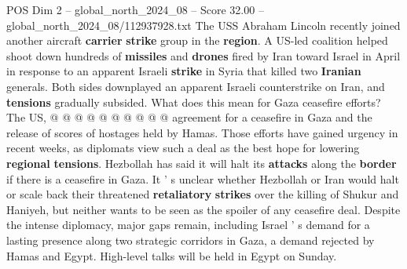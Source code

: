 \begin{textsample}{POS Dim 2 – global\_north\_2024\_08 – Score 32.00 – global\_north\_2024\_08/112937928.txt}
The USS Abraham Lincoln recently joined another aircraft \textbf{carrier} \textbf{strike} group in the \textbf{region}.
A US-led coalition helped shoot down hundreds of \textbf{missiles} and \textbf{drones} fired by Iran toward Israel in April in response to an apparent Israeli \textbf{strike} in Syria that killed two \textbf{Iranian} generals.
Both sides downplayed an apparent Israeli counterstrike on Iran, and \textbf{tensions} gradually subsided.
What does this mean for Gaza ceasefire efforts?
The US, @ @ @ @ @ @ @ @ @ @ agreement for a ceasefire in Gaza and the release of scores of hostages held by Hamas.
Those efforts have gained urgency in recent weeks, as diplomats view such a deal as the best hope for lowering \textbf{regional} \textbf{tensions}.
Hezbollah has said it will halt its \textbf{attacks} along the \textbf{border} if there is a ceasefire in Gaza.
It ' s unclear whether Hezbollah or Iran would halt or scale back their threatened \textbf{retaliatory} \textbf{strikes} over the killing of Shukur and Haniyeh, but neither wants to be seen as the spoiler of any ceasefire deal.
Despite the intense diplomacy, major gaps remain, including Israel ' s demand for a lasting presence along two strategic corridors in Gaza, a demand rejected by Hamas and Egypt.
High-level talks will be held in Egypt on Sunday.

\end{textsample}
